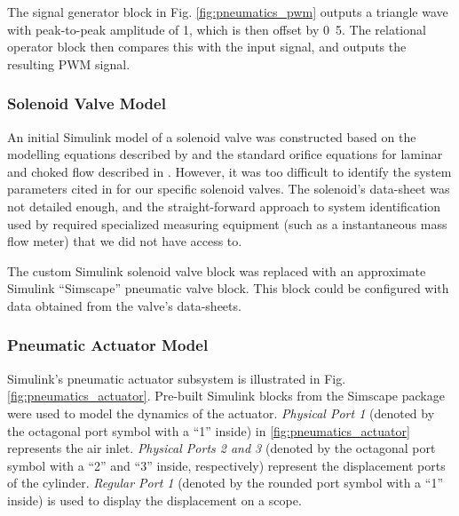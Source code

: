 
The signal generator block in Fig. \ref{fig:pneumatics_pwm} outputs a triangle wave with peak-to-peak amplitude of \unit{1}{\volt}, which is then offset by \unit{0.5}{\volt}. The relational operator block then compares this with the input signal, and outputs the resulting PWM signal.

\subsubsection{Solenoid Valve Model}

An initial Simulink model of a solenoid valve was constructed based on the modelling equations described by \citet{valve_models} and the standard orifice equations for laminar and choked flow described in \cite{fluid_power}. However, it was too difficult to identify the system parameters cited in \cite{fluid_power} for our specific solenoid valves. The solenoid's data-sheet was not detailed enough, and the straight-forward approach to system identification used by \cite{valve_models} required specialized measuring equipment (such as a instantaneous mass flow meter) that we did not have access to.

The custom Simulink solenoid valve block was replaced with an approximate Simulink ``Simscape'' pneumatic valve block. This block could be configured with data obtained from the valve's data-sheets. 

\subsubsection{Pneumatic Actuator Model}

Simulink's pneumatic actuator subsystem is illustrated in Fig. \ref{fig:pneumatics_actuator}. Pre-built Simulink blocks from the Simscape package were used to model the dynamics of the actuator. \emph{Physical Port 1} (denoted by the octagonal port symbol with a ``1'' inside) in \ref{fig:pneumatics_actuator} represents the air inlet. \emph{Physical Ports 2 and 3} (denoted by the octagonal port symbol with a ``2'' and ``3'' inside, respectively) represent the displacement ports of the cylinder. \emph{Regular Port 1} (denoted by the rounded port symbol with a ``1'' inside) is used to display the displacement on a scope.

